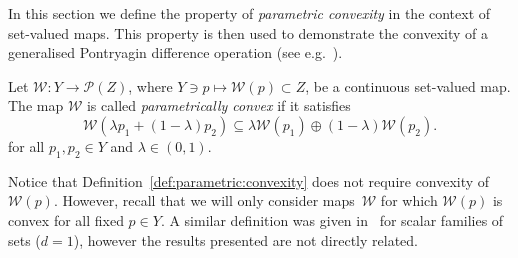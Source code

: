 \documentclass[smallextended]{svjour3}       %
\numberwithin{equation}{section}
\begin{document}
In this section we define the property of \emph{parametric convexity} in the context of set-valued maps. 
%
This property is then used to demonstrate the convexity of a generalised Pontryagin difference operation (see e.g.~\cite{Hadwiger:1950,blanchini:2007}). 
%
%
\begin{definition}\label{def:parametric:convexity}
Let $\mathcal W:Y\rightarrow \mathscr P(Z)$, where $Y\ni p\mapsto \mathcal W(p) \subset Z$, be a continuous set-valued map. The map $\mathcal W$ is called \emph{parametrically convex} if it satisfies
%
  \begin{equation}\label{eq:def:parametrically:convex}
  \mathcal W(\lambda p_1 + (1-\lambda)p_2)\subseteq\lambda \mathcal W(p_1) \oplus (1-\lambda) \mathcal W(p_2).
\end{equation}
for all $p_1,p_2\in Y$ and $\lambda\in (0,1)$.
\end{definition}
%
Notice that Definition~\ref{def:parametric:convexity} does not require convexity of~$\mathcal W(p)$. 
%
However, recall that we will only consider maps~$\mathcal W$ for which $\mathcal W(p)$ is convex for all fixed $p\in Y$.
%
A similar definition was given in~\cite{Hadwiger:1957} for scalar families of sets ($d=1$), however the results presented are not directly related.
\end{document}
